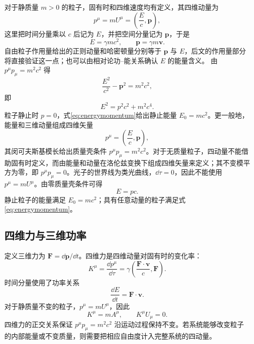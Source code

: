 \documentclass[style=classic,color=full]{lc-article}
\begin{document}
对于静质量 $m>0$ 的粒子，固有时和四维速度均有定义，其四维动量为
\begin{equation}
  p^\mu=mU^\mu
  =\left(\frac{E}{c},\bm p\right),
\end{equation}
这里把时间分量乘以 $c$ 后记为 $E$，并把空间分量记为 $\bm p$，于是
\begin{equation}
  E=\gamma mc^2,
  \qquad
  \bm p=\gamma m\bm v.
\end{equation}
自由粒子作用量给出的正则动量和哈密顿量分别等于 $\bm p$ 与 $E$，后文的作用量部分将直接验证这一点；也可以由相对论功--能关系确认 $E$ 的能量含义。
由 $p^\mu p_\mu=m^2c^2$ 得
\begin{equation}
  \frac{E^2}{c^2}-\bm p^2=m^2c^2,
\end{equation}
即
\begin{equation}
  \boxed{E^2=p^2c^2+m^2c^4.}
  \label{eq:energymomentum}
\end{equation}
粒子静止时 $p=0$，式\eqref{eq:energymomentum}给出静止能量 $E_0=mc^2$。更一般地，能量和三维动量组成四维矢量
\begin{equation}
  p^\mu=\left(\frac{E}{c},\bm p\right),
\end{equation}
其闵可夫斯基模长给出质量壳条件 $p^\mu p_\mu=m^2c^2$。对于无质量粒子，四动量不能借助固有时定义，而由能量和动量在洛伦兹变换下组成四维矢量来定义；其不变模平方为零，即 $p^\mu p_\mu=0$。光子的世界线为类光曲线，$\dd\tau=0$，因此不能使用 $p^\mu=mU^\mu$。由零质量壳条件可得
\begin{equation}
  E=pc.
\end{equation}
静止粒子的能量满足 $E_0=mc^2$；具有任意动量的粒子满足式\eqref{eq:energymomentum}。

\subsection{四维力与三维功率}

定义三维力为 $\bm F=\dd\bm p/\dd t$。四维力是四维动量对固有时的变化率：
\begin{equation}
  K^\mu=\frac{\dd p^\mu}{\dd\tau}
  =\gamma\left(
    \frac{\bm F\mathbin{\cdot}\bm v}{c},
    \bm F
  \right).
  \label{eq:fourforce}
\end{equation}
时间分量使用了功率关系
\begin{equation}
  \frac{\dd E}{\dd t}=\bm F\mathbin{\cdot}\bm v.
\end{equation}
对于静质量不变的粒子，$p^\mu=mU^\mu$，因此
\begin{equation}
  K^\mu=mA^\mu,
  \qquad
  K^\mu U_\mu=0.
  \label{eq:fourforceorthogonal}
\end{equation}
四维力的正交关系保证 $p^\mu p_\mu=m^2c^2$ 沿运动过程保持不变。若系统能够改变粒子的内部能量或不变质量，则需要把相应自由度计入完整系统的四动量。
\end{document}
